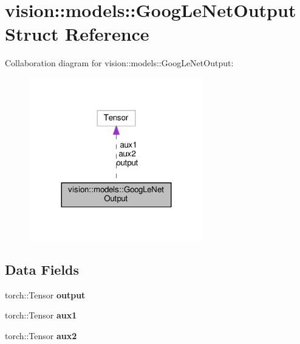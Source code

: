 \hypertarget{structvision_1_1models_1_1GoogLeNetOutput}{}\section{vision\+:\+:models\+:\+:Goog\+Le\+Net\+Output Struct Reference}
\label{structvision_1_1models_1_1GoogLeNetOutput}


Collaboration diagram for vision\+:\+:models\+:\+:Goog\+Le\+Net\+Output\+:
\nopagebreak
\begin{figure}[H]
\begin{center}
\leavevmode
\includegraphics[width=215pt]{structvision_1_1models_1_1GoogLeNetOutput__coll__graph}
\end{center}
\end{figure}
\subsection*{Data Fields}
\begin{DoxyCompactItemize}
\item 
\mbox{\label{structvision_1_1models_1_1GoogLeNetOutput_a0025f89aeec8321d791f568f501afa72}} 
torch\+::\+Tensor {\bfseries output}
\item 
\mbox{\label{structvision_1_1models_1_1GoogLeNetOutput_a9c194a11f640a1164cb878176b00a626}} 
torch\+::\+Tensor {\bfseries aux1}
\item 
\mbox{\label{structvision_1_1models_1_1GoogLeNetOutput_a7ff12cbe7055068081e87ddc9990746e}} 
torch\+::\+Tensor {\bfseries aux2}
\end{DoxyCompactItemize}


